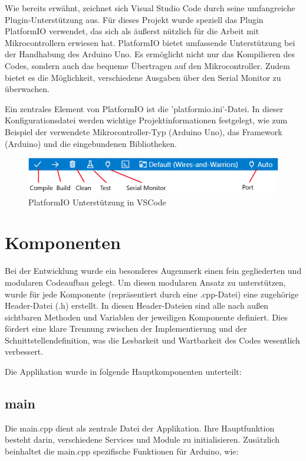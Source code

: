 Wie bereits erwähnt, zeichnet sich Visual Studio Code durch seine umfangreiche Plugin-Unterstützung aus. Für dieses Projekt wurde speziell das Plugin PlatformIO verwendet, das sich als äußerst nützlich für die Arbeit mit Mikrocontrollern erwiesen hat. PlatformIO bietet umfassende Unterstützung bei der Handhabung des Arduino Uno. Es ermöglicht nicht nur das Kompilieren des Codes, sondern auch das bequeme Übertragen auf den Mikrocontroller. Zudem bietet es die Möglichkeit, verschiedene Ausgaben über den Serial Monitor zu überwachen.

Ein zentrales Element von PlatformIO ist die 'platformio.ini'-Datei. In dieser Konfigurationsdatei werden wichtige Projektinformationen festgelegt, wie zum Beispiel der verwendete Mikrocontroller-Typ (Arduino Uno), das Framework (Arduino) und die eingebundenen Bibliotheken.

\begin{figure}[H]
    \centerline{\includegraphics[width=.85\textwidth,scale=1]{./images/platformio.png}}
    \caption{PlatformIO Unterstützung in VSCode}\label{herzen}
\end{figure}

\section{Komponenten}

Bei der Entwicklung wurde ein besonderes Augenmerk einen fein gegliederten und modularen Codeaufbau gelegt. Um diesen modularen Ansatz zu unterstützen, wurde für jede Komponente (repräsentiert durch eine .cpp-Datei) eine zugehörige Header-Datei (.h) erstellt. In diesen Header-Dateien sind alle nach außen sichtbaren Methoden und Variablen der jeweiligen Komponente definiert. Dies fördert eine klare Trennung zwischen der Implementierung und der Schnittstellendefinition, was die Lesbarkeit und Wartbarkeit des Codes wesentlich verbessert.

Die Applikation wurde in folgende Hauptkomponenten unterteilt: 

\subsection{main}

Die main.cpp dient als zentrale Datei der Applikation. Ihre Hauptfunktion besteht darin, verschiedene Services und Module zu initialisieren. Zusätzlich beinhaltet die main.cpp spezifische Funktionen für Arduino, wie:

